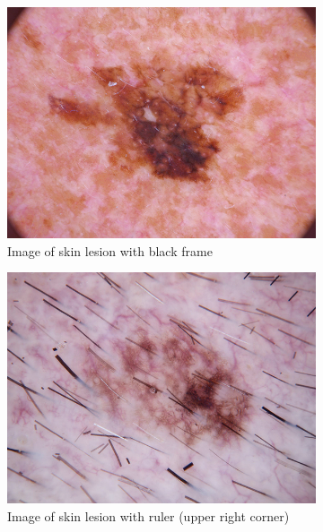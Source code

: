 \begin{figure}[ht]
    \begin{center}
        \begin{subfigure}[b]{0.3\textwidth}
            \includegraphics[width=\textwidth]{./images/ISIC_0024310.jpg}
            \caption{Image of skin lesion with black frame}
        \end{subfigure}
        \begin{subfigure}[b]{0.3\textwidth}
            \includegraphics[width=\textwidth]{./images/ISIC_0024420.jpg}
            \caption{Image of skin lesion with ruler (upper right corner)}
        \end{subfigure}
        \begin{subfigure}[b]{0.3\textwidth}

\end{subfigure}
\end{center}
\end{figure}
